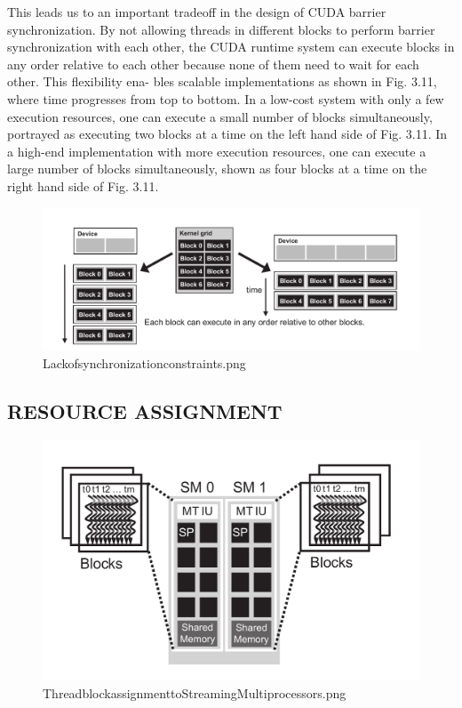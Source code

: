 \documentclass[11pt]{ctexart}
\begin{document}
This leads us to an important tradeoff in the design of CUDA barrier synchronization. By not allowing threads in different blocks to perform barrier synchronization
with each other, the CUDA runtime system can execute blocks in any order relative
to each other because none of them need to wait for each other. This flexibility ena-
bles scalable implementations as shown in Fig. 3.11, where time progresses from top
to bottom. In a low-cost system with only a few execution resources, one can execute
a small number of blocks simultaneously, portrayed as executing two blocks at a time
on the left hand side of Fig. 3.11. In a high-end implementation with more execution
resources, one can execute a large number of blocks simultaneously, shown as four
blocks at a time on the right hand side of Fig. 3.11.

\begin{figure}[ht]
	\centering
	\includegraphics[width=1.0\textwidth]{photos/Lackofsynchronizationconstraints.png}
	\caption{Lackofsynchronizationconstraints.png}
	\label{fig:2}
\end{figure}


\subsection{RESOURCE ASSIGNMENT}

\begin{figure}[ht]
	\centering
	\includegraphics[width=1.0\textwidth]{photos/ThreadblockassignmenttoStreamingMultiprocessors.png}
	\caption{ThreadblockassignmenttoStreamingMultiprocessors.png}
	\label{fig:3}
\end{figure}
\end{document}
